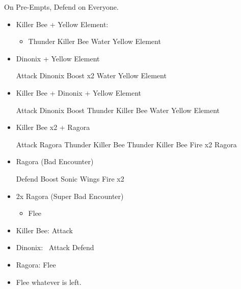 \begin{encounters}
	On Pre-Empts, Defend on Everyone.
	\begin{itemize}
		\item Killer Bee + Yellow Element:
		      \begin{itemize}
			      \tidusf Defend
			      \summon{\valefor}
			      \valeforf Boost
			      \item Thunder Killer Bee
			            \valeforf Water Yellow Element
		      \end{itemize}
		\item Dinonix + Yellow Element
		      \begin{itemize}
			      \tidusf Attack Dinonix
			      \summon{\valefor}
			      \valeforf Boost x2
			      \valeforf Water Yellow Element
		      \end{itemize}
		\item Killer Bee + Dinonix + Yellow Element
		      \begin{itemize}
			      \tidusf Attack Dinonix
			      \summon{\valefor}
			      \valeforf Boost
			      \valeforf Thunder Killer Bee
			      \valeforf Water Yellow Element
		      \end{itemize}
		\item Killer Bee x2 + Ragora
			\begin{itemize}
				\tidusf Attack Ragora
				\summon{\valefor}
				\valeforf Thunder Killer Bee
				\valeforf Thunder Killer Bee
				\valeforf Fire x2 Ragora
			\end{itemize}
		\item Ragora (Bad Encounter)
		      \begin{itemize}
			      \tidusf Defend
			      \summon{\valefor}
			      \valeforf Boost
			      \valeforf Sonic Wings
			      \valeforf Fire x2
		      \end{itemize}
		\item 2x Ragora (Super Bad Encounter)
		      \begin{itemize}
			      \tidusf Defend
			      \summon{\valefor}
			      \valeforf Boost
			      \valeforf Dismiss
			      \wakkaf Defend
			      \item Flee
		      \end{itemize}
	\end{itemize}
\end{encounters}
\begin{encounters}
	\begin{itemize}
		\item Killer Bee: \wakkaf Attack
		\item Dinonix: \tidus\ Attack
		      \yunaf Defend
		\item Ragora: Flee
		\item Flee whatever is left.
	\end{itemize}
\end{encounters}
